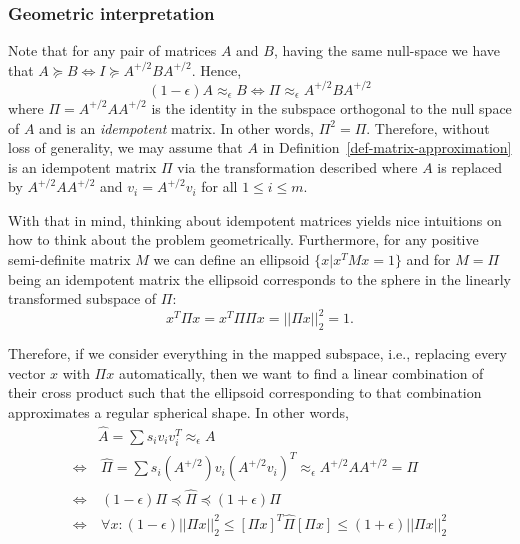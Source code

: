 \documentclass[
  letterpaper,
  DIV=11,
  numbers=noendperiod]{scrartcl}
\theoremstyle{plain}
\theoremstyle{plain}
\theoremstyle{plain}
\theoremstyle{definition}
\theoremstyle{remark}
\begin{document}
\hypertarget{geometric-interpretation}{%
\subsubsection{Geometric
interpretation}\label{geometric-interpretation}}

Note that for any pair of matrices \(A\) and \(B\), having the same
null-space we have that
\(A \succeq B \Longleftrightarrow I \succeq A^{+/2} B A^{+/2}\). Hence,
\[(1 - \epsilon) A \approx_\epsilon B \Longleftrightarrow \Pi \approx_\epsilon A^{+/2} B A^{+/2}\]
where \(\Pi = A^{+/2} A A^{+/2}\) is the identity in the subspace
orthogonal to the null space of \(A\) and is an \emph{idempotent}
matrix. In other words, \(\Pi^2 = \Pi\). Therefore, without loss of
generality, we may assume that \(A\) in
Definition~\ref{def-matrix-approximation} is an idempotent matrix
\(\Pi\) via the transformation described where \(A\) is replaced by
\(A^{+/2} A A^{+/2}\) and \(v_i = A^{+/2} v_i\) for all
\(1 \le i \le m\).

With that in mind, thinking about idempotent matrices yields nice
intuitions on how to think about the problem geometrically. Furthermore,
for any positive semi-definite matrix \(M\) we can define an ellipsoid
\(\{x | x^T M x = 1\}\) and for \(M = \Pi\) being an idempotent matrix
the ellipsoid corresponds to the sphere in the linearly transformed
subspace of \(\Pi\): \[x^T \Pi x = x^T \Pi \Pi x = ||\Pi x||_2^2 = 1.\]

Therefore, if we consider everything in the mapped subspace, i.e.,
replacing every vector \(x\) with \(\Pi x\) automatically, then we want
to find a linear combination of their cross product such that the
ellipsoid corresponding to that combination approximates a regular
spherical shape. In other words, \begin{align*}
&\hat{A} = \sum s_i v_i v_i^T \approx_\epsilon A \\
\Longleftrightarrow & ~ \hat{\Pi} = \sum s_i (A^{+/2}) v_i (A^{+/2} v_i)^T  \approx_\epsilon A^{+/2} A A^{+/2} = \Pi\\
\Longleftrightarrow & ~ (1 - \epsilon) \Pi \preceq \hat{\Pi} \preceq (1 + \epsilon) \Pi \\
\Longleftrightarrow & ~ \forall x : (1 - \epsilon) ||\Pi x||_2^2 \le [\Pi x]^T \hat{\Pi} [\Pi x] \le (1 + \epsilon) ||\Pi x||_2^2 \\
\end{align*}
\end{document}
